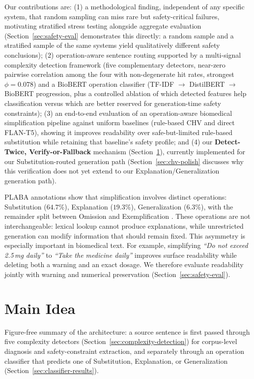 \documentclass[11pt]{article}
\begin{document}
Our contributions are: (1) a methodological finding, independent of any
specific system, that random sampling can miss rare but safety-critical
failures, motivating stratified stress testing alongside aggregate
evaluation (Section~\ref{sec:safety-eval} demonstrates this directly: a
random sample and a stratified sample of the same systems yield
qualitatively different safety conclusions); (2) operation-aware sentence
routing supported by a multi-signal complexity detection framework (five
complementary detectors, near-zero pairwise correlation among the four with
non-degenerate hit rates, strongest $\phi = 0.078$) and a BioBERT operation
classifier (TF-IDF $\rightarrow$ DistilBERT $\rightarrow$ BioBERT
progression, plus a controlled ablation of which detected features help
classification versus which are better reserved for generation-time safety
constraints); (3) an end-to-end evaluation of an operation-aware biomedical
simplification pipeline against uniform baselines (rule-based CHV and direct
FLAN-T5), showing it improves readability over safe-but-limited rule-based
substitution while retaining that baseline's safety profile; and (4) our
\textbf{Detect-Twice, Verify-or-Fallback} mechanism (Section~\ref{sec:main-idea}),
currently implemented for our Substitution-routed generation path
(Section~\ref{sec:chv-polish} discusses why this verification does not yet
extend to our Explanation/Generalization generation path).

PLABA annotations show that simplification involves distinct operations:
Substitution ($64.7\%$), Explanation ($19.3\%$), Generalization ($6.3\%$),
with the remainder split between Omission and Exemplification
\citep{ondov2025lessons}. These operations are not interchangeable: lexical
lookup cannot produce explanations, while unrestricted generation can modify
information that should remain fixed. This asymmetry is especially important
in biomedical text. For example, simplifying \emph{``Do not exceed 2.5\,mg
daily''} to \emph{``Take the medicine daily''} improves surface readability
while deleting both a warning and an exact dosage. We therefore evaluate
readability jointly with warning and numerical preservation
(Section~\ref{sec:safety-eval}).

\section{Main Idea}
\label{sec:main-idea}

Figure-free summary of the architecture: a source sentence is first passed
through five complexity detectors (Section~\ref{sec:complexity-detection}) for
corpus-level diagnosis and safety-constraint extraction, and separately through
an operation classifier that predicts one of Substitution, Explanation, or
Generalization (Section~\ref{sec:classifier-results}).
\end{document}
